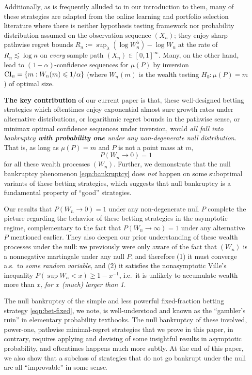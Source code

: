Additionally, as is frequently alluded to in our introduction to them, many of these strategies are adapted from the online learning and portfolio selection literature where there is neither hypothesis testing framework nor probability distribution assumed on the observation sequence $(X_n)$; they enjoy sharp pathwise regret bounds $R_n := \sup_{\lambda} (\log W_n^\lambda) - \log W_n$ at the rate of $R_n \lesssim \log n$ on \emph{every} sample path $(X_n) \in [0,1]^\infty$. Many, on the other hand, lead to $(1-\alpha)$-confidence sequences for $\mu(P)$ by inversion $\operatorname{CI}_n = \{ m : W_n(m) \leqslant 1/\alpha \}$ (where $W_n(m)$ is the wealth testing $H_0: \mu(P) = m$) of optimal size.


\textbf{The key contribution} of our current paper is that, these well-designed betting strategies which oftentimes enjoy exponential almost sure growth rates under alternative distributions, or logarithmic regret bounds in the pathwise sense, or minimax optimal confidence sequences under inversion, would \emph{all fall into bankruptcy \textbf{with probability one} under any non-degenerate null distribution}.
That is, as long as $\mu(P) = m$ and $P$ is not a point mass at $m$,
\begin{equation}\label{eqn:bankruptcy}
    P( W_n \to 0 ) = 1
\end{equation}
for all these wealth processes $(W_n)$. Further, we demonstrate that the null bankruptcy phenomenon \eqref{eqn:bankruptcy} does \emph{not} happen on some suboptimal variants of these betting strategies, which suggests that null bankruptcy is a fundamental property of ``good'' strategies.

Our results that $P( W_n \to 0 ) = 1$ under any non-degenerate null $P$ complete the picture regarding the behavior of these betting strategies in the asymptotic regime, complementary to the fact that $P(W_n \to \infty) = 1$ under any alternative $P$  mentioned earlier. They also deepen our prior understanding of these wealth processes under the null: we previously were only aware of the fact that $(W_n)$ is a nonnegative martingale under any null $P$, and therefore (1) it must converge a.s.\ to \emph{some random variable}, and (2) it satisfies the nonasymptotic Ville's inequality $P( \sup W_n < x) \ge 1- x^{-1}$, i.e.\ it is unlikely to accumulate wealth more than $x$, \emph{for $x$ (much) larger than 1}.

The null bankruptcy of the simple and less powerful fixed-fraction betting strategy \eqref{eqn:bet-fixed}, we note, is well-understood and known as the ``gambler's ruin'' in elementary probability textbooks. The null bankruptcy of these involved, power-one, pathwise minimal-regret strategies that we prove in this paper, in contrary, requires applying and devising of some insightful results in asymptotic probability, and oftentimes happens much more subtly. At the end of this paper, we also 
show that a subclass of strategies that do not go bankrupt under the null are all ``improvable'' in some sense. 


